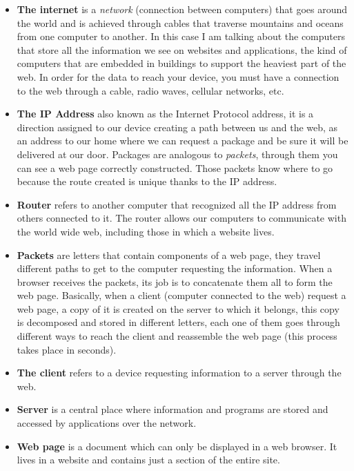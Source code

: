 \documentclass{article}
\begin{document}
	\begin{itemize}
		\item \textbf{The internet} is a \textit{network} (connection between computers) that goes around the world and is achieved through cables that traverse mountains and oceans from one computer to another. In this case I am talking about the computers that store all the information we see on websites and applications, the kind of computers that are embedded in buildings to support the heaviest part of the web. In order for the data to reach your device, you must have a connection to the web through a cable, radio waves, cellular networks, etc.
		
		\item \textbf{The IP Address} also known as the Internet Protocol address, it is a direction assigned to our device creating a path between us and the web, as an address to our home where we can request a package and be sure it will be delivered at our door. Packages are analogous to \textit{packets}, through them you can see a web page correctly constructed. Those packets know where to go because the route created is unique thanks to the IP address.
		
		\item \textbf{Router} refers to another computer that recognized all the IP address from others connected to it. The router allows our computers to communicate with the world wide web, including those in which a website lives.
		
		\item \textbf{Packets} are letters that contain components of a web page, they travel different paths to get to the computer requesting the information. When a browser receives the packets, its job is to concatenate them all to form the web page. Basically, when a client (computer connected to the web) request a web page, a copy of it is created on the server to which it belongs, this copy is decomposed and stored in different letters, each one of them goes through different ways to reach the client and reassemble the web page (this process takes place in seconds).
		
		\item \textbf{The client} refers to a device requesting information to a server through the web.
		
		\item \textbf{Server} is a central place where information and programs are stored and accessed by applications over the network.
		
		\item \textbf{Web page} is a document which can only be displayed in a web browser. It lives in a website and contains just a section of the entire site.
		

\end{itemize}
\end{document}
